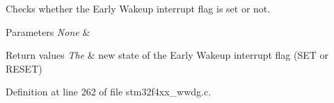 Checks whether the Early Wakeup interrupt flag is set or not. 


\begin{DoxyParams}{Parameters}
{\em None} & \\
\hline
\end{DoxyParams}

\begin{DoxyRetVals}{Return values}
{\em The} & new state of the Early Wakeup interrupt flag (S\-E\-T or R\-E\-S\-E\-T) \\
\hline
\end{DoxyRetVals}


Definition at line 262 of file stm32f4xx\-\_\-wwdg.\-c.

